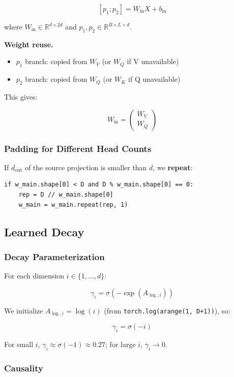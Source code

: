 \[
[p_1; p_2] = W_\text{in} X + b_\text{in}
\tag{4.1}
\]

where $W_\text{in} \in \mathbb{R}^{d \times 2d}$ and $p_1, p_2 \in \mathbb{R}^{B \times L \times d}$.

\textbf{Weight reuse.}

\begin{itemize}
\item $p_1$ branch: copied from $W_V$ (or $W_Q$ if V unavailable)
\item $p_2$ branch: copied from $W_Q$ (or $W_K$ if Q unavailable)

\end{itemize}
This gives:

\[
W_\text{in} = \begin{pmatrix} W_V \\ W_Q \end{pmatrix}
\tag{4.2}
\]

\subsubsection{Padding for Different Head Counts}

If $d_\text{out}$ of the source projection is smaller than $d$, we \textbf{repeat}:

\begin{lstlisting}
if w_main.shape[0] < D and D % w_main.shape[0] == 0:
    rep = D // w_main.shape[0]
    w_main = w_main.repeat(rep, 1)
\end{lstlisting}

\subsection{Learned Decay}

\subsubsection{Decay Parameterization}

For each dimension $i \in \{1, \dots, d\}$:

\[
\gamma_i = \sigma(-\exp(A_{\log, i}))
\tag{4.3}
\]

We initialize $A_{\log, i} = \log(i)$ (from \texttt{torch.log(arange(1, D+1))}), so:

\[
\gamma_i = \sigma(-i)
\tag{4.4}
\]

For small $i$, $\gamma_i \approx \sigma(-1) \approx 0.27$; for large $i$, 
$\gamma_i \to 0$.

\subsubsection{Causality}

